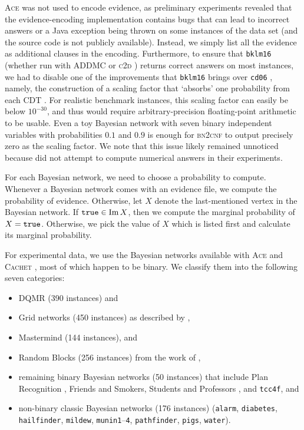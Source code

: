 \textsc{Ace} was not used to encode evidence, as preliminary experiments
revealed that the evidence-encoding implementation contains bugs that can lead
to incorrect answers or a Java exception being thrown on some instances of the
data set (and the source code is not publicly available). Instead, we simply
list all the evidence as additional clauses in the encoding. Furthermore, to
ensure that \texttt{bklm16} \citep{DBLP:conf/ecai/BartKLM16} (whether run with
\textsc{ADDMC} \citep{DBLP:conf/aaai/DudekPV20} or \textsc{c2d}
\citep{DBLP:conf/ecai/Darwiche04}) returns correct answers on most instances, we
had to disable one of the improvements that \texttt{bklm16} brings over
\texttt{cd06} \citep{DBLP:conf/sat/ChaviraD06}, namely, the construction of a
scaling factor that `absorbs' one probability from each CDT
\citep{DBLP:conf/ecai/BartKLM16}. For realistic benchmark instances, this
scaling factor can easily be below $10^{-30}$, and thus would require
arbitrary-precision floating-point arithmetic to be usable. Even a toy Bayesian
network with seven binary independent variables with probabilities $0.1$ and
$0.9$ is enough for \textsc{bn2cnf} to output precisely zero as the scaling
factor. We note that this issue likely remained unnoticed because
\citet{DBLP:conf/ecai/BartKLM16} did not attempt to compute numerical answers in
their experiments.

For each Bayesian network, we need to choose a probability to compute. Whenever
a Bayesian network comes with an evidence file, we compute the probability of
evidence. Otherwise, let $X$ denote the last-mentioned vertex in the Bayesian
network. If $\texttt{true}{} \in \operatorname{Im} X$, then we compute the marginal probability of
$X = \texttt{true}{}$. Otherwise, we pick the value of $X$ which is listed first and
calculate its marginal probability.

For experimental data, we use the Bayesian networks available with \textsc{Ace}
and \textsc{Cachet} \citep{DBLP:conf/sat/SangBBKP04}, most of which happen to be
binary. We classify them into the following seven categories:
\begin{itemize}
  \item DQMR (390 instances) and
  \item Grid networks (450 instances) as described by
        \citet{DBLP:conf/aaai/SangBK05},
  \item Mastermind (144 instances), and
  \item Random Blocks (256 instances) from the work of
        \citet{DBLP:journals/ijar/ChaviraDJ06},
  \item remaining binary Bayesian networks (50 instances) that include Plan
        Recognition \citep{DBLP:conf/aaai/SangBK05}, Friends and Smokers,
        Students and Professors \citep{DBLP:journals/ijar/ChaviraDJ06}, and
        \texttt{tcc4f}, and
  \item non-binary classic Bayesian networks (176 instances) (\texttt{alarm},
        \texttt{diabetes}, \texttt{hailfinder}, \texttt{mildew},
        \texttt{munin1}--\texttt{4}, \texttt{pathfinder}, \texttt{pigs},
        \texttt{water}).
\end{itemize}

